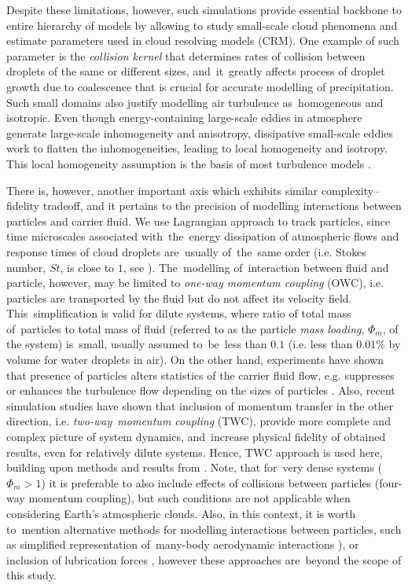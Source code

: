 \documentclass{pracamgren}
\begin{document}
Despite these limitations, however, such simulations provide essential backbone to entire hierarchy of models by allowing to study small-scale cloud phenomena and estimate parameters used in cloud resolving models (CRM).
One example of such parameter is the \emph{collision kernel} that determines rates of collision between droplets of the same or different sizes, and~it~greatly affects process of droplet growth due to coalescence that is crucial for accurate modelling of precipitation.
Such small domains also justify modelling air turbulence as~homogeneous and isotropic.
Even though energy-containing large-scale eddies in atmosphere generate large-scale inhomogeneity and anisotropy, dissipative small-scale eddies work to flatten the inhomogeneities, leading to local homogeneity and isotropy.
This local homogeneity assumption is the basis of most turbulence models \parencite{Matsuda2021}.

There is, however, another important axis which exhibits similar complexity--fidelity tradeoff, and it pertains to the precision of modelling interactions between particles and carrier fluid.
We use Lagrangian approach to track particles, since time microscales associated with~the~energy dissipation of atmospheric flows and response times of cloud droplets are~usually of~the~same order (i.e. Stokes number, $St$, is close to $1$, see \cite{Balachandar2009}).
The~modelling of~interaction between fluid and particle, however, may be limited to \emph{one-way momentum coupling} (OWC), i.e. particles are transported by the fluid but do not affect its velocity field.
This~simplification is valid for dilute systems, where ratio of total mass of~particles to total mass of fluid (referred to as the particle \emph{mass loading}, $\Phi_m$, of the system) is~small, usually assumed to~be~less than $0.1$ (i.e. less than $0.01\%$ by volume for water droplets in air).
On the other hand, experiments have shown that presence of particles alters statistics of the carrier fluid flow, e.g. suppresses or enhances the turbulence flow depending on the sizes of particles \parencite{Gore1989}.
Also, recent simulation studies \parencite{Rosa2020} have shown that inclusion of momentum transfer in the other direction, i.e. \emph{two-way~momentum coupling} (TWC), provide more complete and complex picture of system dynamics, and~increase physical fidelity of obtained results, even for relatively dilute systems.
Hence, TWC approach is used here, building upon methods and results from \textcite{Rosa2020,Rosa2022}.
Note, that for~very dense systems ($\Phi_m > 1$) it is preferable to also include effects of collisions between particles (four-way momentum coupling), but such conditions are not applicable when considering Earth's atmospheric clouds.
Also, in this context, it is worth to~mention alternative methods for modelling interactions between particles, such as simplified representation of~many-body aerodynamic interactions \parencite[Hybrid DNS, see][]{Wang2009, Ayala2007}), or inclusion of lubrication forces \parencite{Ababaei2021}, however these approaches are~beyond the scope of this study.
\end{document}
